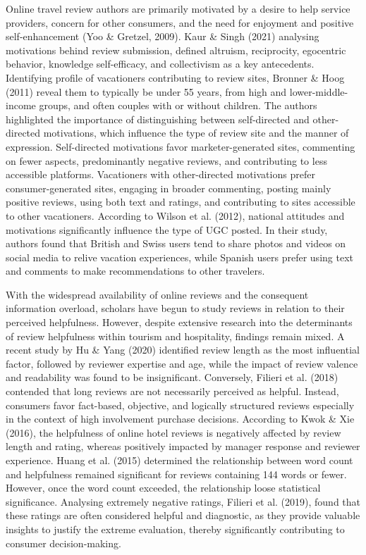 \documentclass[
]{agujournal2019}
\begin{document}
Online travel review authors are primarily motivated by a desire to help
service providers, concern for other consumers, and the need for
enjoyment and positive self-enhancement (Yoo \& Gretzel, 2009). Kaur \&
Singh (2021) analysing motivations behind review submission, defined
altruism, reciprocity, egocentric behavior, knowledge self-efficacy, and
collectivism as a key antecedents. Identifying profile of vacationers
contributing to review sites, Bronner \& Hoog (2011) reveal them to
typically be under 55 years, from high and lower-middle-income groups,
and often couples with or without children. The authors highlighted the
importance of distinguishing between self-directed and other-directed
motivations, which influence the type of review site and the manner of
expression. Self-directed motivations favor marketer-generated sites,
commenting on fewer aspects, predominantly negative reviews, and
contributing to less accessible platforms. Vacationers with
other-directed motivations prefer consumer-generated sites, engaging in
broader commenting, posting mainly positive reviews, using both text and
ratings, and contributing to sites accessible to other vacationers.
According to Wilson et al. (2012), national attitudes and motivations
significantly influence the type of UGC posted. In their study, authors
found that British and Swiss users tend to share photos and videos on
social media to relive vacation experiences, while Spanish users prefer
using text and comments to make recommendations to other travelers.

With the widespread availability of online reviews and the consequent
information overload, scholars have begun to study reviews in relation
to their perceived helpfulness. However, despite extensive research into
the determinants of review helpfulness within tourism and hospitality,
findings remain mixed. A recent study by Hu \& Yang (2020) identified
review length as the most influential factor, followed by reviewer
expertise and age, while the impact of review valence and readability
was found to be insignificant. Conversely, Filieri et al. (2018)
contended that long reviews are not necessarily perceived as helpful.
Instead, consumers favor fact-based, objective, and logically structured
reviews especially in the context of high involvement purchase
decisions. According to Kwok \& Xie (2016), the helpfulness of online
hotel reviews is negatively affected by review length and rating,
whereas positively impacted by manager response and reviewer experience.
Huang et al. (2015) determined the relationship between word count and
helpfulness remained significant for reviews containing 144 words or
fewer. However, once the word count exceeded, the relationship loose
statistical significance. Analysing extremely negative ratings, Filieri
et al. (2019), found that these ratings are often considered helpful and
diagnostic, as they provide valuable insights to justify the extreme
evaluation, thereby significantly contributing to consumer
decision-making.
\end{document}

